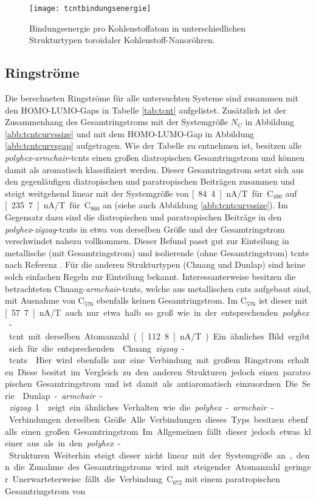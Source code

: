 \begin{figure}[ht!]
	\centering
	\texttt{[image: tcntbindungsenergie]}
	\captionsetup{figurewithin = chapter}
	\captionsetup{font=small, labelfont=bf}\caption[Bindungsenergie toroidaler Kohlenstoff-Nanoröhren]{Bindungsenergie pro Kohlenstoffatom in unterschiedlichen Strukturtypen toroidaler Kohlenstoff-Nanoröhren.}
\label{abb:tcntbindungsenergie}
\end{figure}

\subsection{Ringströme}

Die berechneten Ringströme für alle untersuchten Systeme sind zusammen mit den HOMO-LUMO-Gaps in Tabelle \ref{tab:tcnt} aufgelistet. Zusätzlich ist der Zusammenhang des Gesamtringstroms mit der Systemgröße $N_\textrm{C}$ in Abbildung \ref{abb:tcntcurvssize} und mit dem HOMO-LUMO-Gap in Abbildung \ref{abb:tcntcurvsgap} aufgetragen. Wie der Tabelle zu entnehmen ist, besitzen alle \textit{polyhex}-\textit{armchair}-\acp{tcnt} einen großen diatropischen Gesamtringstrom und können damit als aromatisch klassifiziert werden. Dieser Gesamtringstrom setzt sich aus den gegenläufigen diatropischen und paratropischen Beiträgen zusammen und steigt weitgehend linear mit der Systemgröße von \unit[84.4]{nA/T} für C$_{480}$ auf \unit[235.7]{nA/T} für C$_{960}$ an (siehe auch Abbildung \ref{abb:tcntcurvssize}). Im Gegensatz dazu sind die diatropischen und paratropischen Beiträge in den \textit{polyhex}-\textit{zigzag}-\acp{tcnt} in etwa von derselben Größe und der Gesamtringstrom verschwindet nahezu vollkommen. Dieser Befund passt gut zur Einteilung in metallische (mit Gesamtringstrom) und isolierende (ohne Gesamtringstrom) \acp{tcnt} nach Referenz \cite{zhang2005electronic}. Für die anderen Strukturtypen (Chuang und Dunlap) sind keine solch einfachen Regeln zur Einteilung bekannt. Interessanterweise besitzen die betrachteten \glqq Chuang-\textit{armchair}-\acp{tcnt}\grqq{}, welche aus metallischen \acp{cnt} aufgebaut sind, mit Ausnahme von C$_{576}$ ebenfalls keinen Gesamtringstrom. Im C$_{576}$ ist dieser mit \unit[57.7]{nA/T} auch nur etwa halb so groß wie in der entsprechenden \textit{polyhex}-\ac{tcnt} mit derselben Atomanzahl (\unit[112.8]{nA/T}). Ein ähnliches Bild ergibt sich für die entsprechenden \glqq Chuang \textit{zigzag}-\acp{tcnt}\grqq{}. Hier wird ebenfalls nur eine Verbindung mit großem Ringstrom erhalten. Diese besitzt im Vergleich zu den anderen Strukturen jedoch einen paratropischen Gesamtringstrom und ist damit als antiaromatisch einzuordnen. Die Serie \glqq Dunlap-\textit{armchair}-\textit{zigzag} 1\grqq{} zeigt ein ähnliches Verhalten wie die \textit{polyhex}-\textit{armchair}-Verbindungen derselben Größe. Alle Verbindungen dieses Typs besitzen ebenfalls einen großen Gesamtringstrom. Im Allgemeinen fällt dieser jedoch etwas kleiner aus als in den \textit{polyhex}-Strukturen. Weiterhin steigt dieser nicht linear mit der Systemgröße an, denn die Zunahme des Gesamtringstroms wird mit steigender Atomanzahl geringer. Unerwarteterweise fällt die Verbindung C$_{672}$ mit einem paratropischen Gesamtringstrom von 